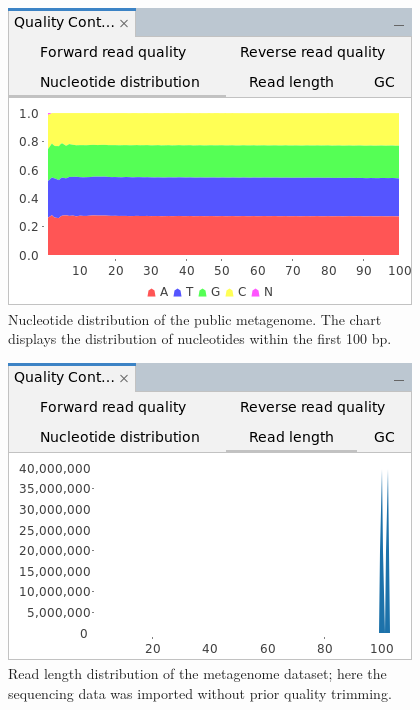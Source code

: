 \begin{figure}[H]
\centering
\includegraphics[width=.6\textwidth]{img/mgx/QCnuc}
\caption[Quality control]{Nucleotide distribution of the public metagenome. The chart displays the distribution
of nucleotides within the first 100 bp.}
\label{qc2}
\end{figure}

\begin{figure}[H]
\centering
\includegraphics[width=.6\textwidth]{img/mgx/QCreadlen}
\caption[Quality control]{Read length distribution of the metagenome dataset; here the sequencing
data was imported without prior quality trimming.}
\label{qc3}
\end{figure}

